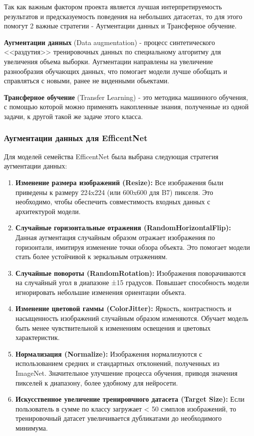 \documentclass[14pt]{extarticle}
\begin{document}
Так как важным фактором проекта является лучшая интерпретируемость результатов и предсказуемость поведения на небольших датасетах, то для этого помогут 2 важные стратегии - Аугментации данных и Трансферное обучение.

\textbf{Аугментации данных} (Data augmentation) - процесс синтетического <<раздутия>> тренировочных данных по специальному алгоритму для увеличения объема выборки. Аугментации направлены на увеличение разнообразия обучающих данных, что помогает модели лучше обобщать и справляться с новыми, ранее не виденными обьектами.

\textbf{Трансферное обучение} (Transfer Learning) - это методика машинного обучения, с помощью которой можно применять накопленные знания, полученные из одной задачи, к другой такой же задаче этого класса.

\subsubsection{Аугментации данных для EfficentNet}
Для моделей семейства EfficentNet была выбрана следующая стратегия аугментации данных:
\begin{enumerate}
    \item \textbf{Изменение размера изображений (Resize):} Все изображения были приведены к размеру 224x224 (или 600x600 для B7) пикселя. Это необходимо, чтобы обеспечить совместимость входных данных с архитектурой модели.
    \item \textbf{Случайные горизонтальные отражения (RandomHorizontalFlip):} Данная аугментация случайным образом отражает изображения по горизонтали, имитируя изменение точки обзора объекта. Это помогает модели стать более устойчивой к зеркальным отражениям.
    \item \textbf{Случайные повороты (RandomRotation):} Изображения поворачиваются на случайный угол в диапазоне ±15 градусов. Повышает способность модели игнорировать небольшие изменения ориентации объекта.
    \item \textbf{Изменение цветовой гаммы (ColorJitter):} Яркость, контрастность и насыщенность изображений случайным образом изменяются. Обучает модель быть менее чувствительной к изменениям освещения и цветовых характеристик.
    \item \textbf{Нормализация (Normalize):} Изображения нормализуются с использованием средних и стандартных отклонений, полученных из ImageNet. Значительное улучшение процесса обучения, приводя значения пикселей к диапазону, более удобному для нейросети.\cite{tan2019efficientnet}
    \item \textbf{Искусственное увеличение тренировчного датасета (Target Size):} Если пользователь в сумме по классу загружает < 50 сэмплов изображений, то тренировочный датасет увеличивается дубликатами до необходимого минимума.
\end{enumerate}
\end{document}
